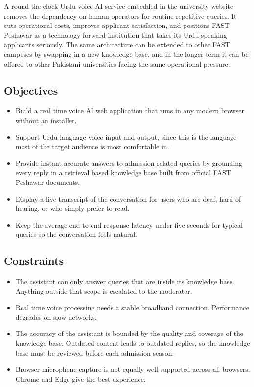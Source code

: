 \documentclass[12pt,a4paper]{report}
\begin{document}
A round the clock Urdu voice AI service embedded in the university website
removes the dependency on human operators for routine repetitive queries.
It cuts operational costs, improves applicant satisfaction, and positions
FAST Peshawar as a technology forward institution that takes its Urdu
speaking applicants seriously. The same architecture can be extended to
other FAST campuses by swapping in a new knowledge base, and in the
longer term it can be offered to other Pakistani universities facing the
same operational pressure.

\subsection{Objectives}

\begin{itemize}
  \item Build a real time voice AI web application that runs in any modern
        browser without an installer.
  \item Support Urdu language voice input and output, since this is the
        language most of the target audience is most comfortable in.
  \item Provide instant accurate answers to admission related queries by
        grounding every reply in a retrieval based knowledge base built
        from official FAST Peshawar documents.
  \item Display a live transcript of the conversation for users who are
        deaf, hard of hearing, or who simply prefer to read.
  \item Keep the average end to end response latency under five seconds for
        typical queries so the conversation feels natural.
\end{itemize}

\newpage
\subsection{Constraints}

\begin{itemize}
  \item The assistant can only answer queries that are inside its knowledge
        base. Anything outside that scope is escalated to the moderator.
  \item Real time voice processing needs a stable broadband connection.
        Performance degrades on slow networks.
  \item The accuracy of the assistant is bounded by the quality and
        coverage of the knowledge base. Outdated content leads to
        outdated replies, so the knowledge base must be reviewed before
        each admission season.
  \item Browser microphone capture is not equally well supported across
        all browsers. Chrome and Edge give the best experience.
\end{itemize}
\end{document}
